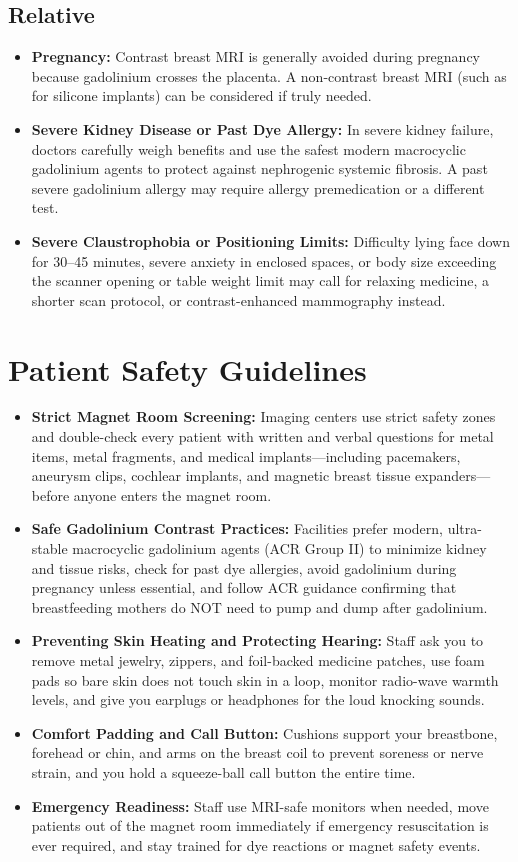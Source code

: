 \subsection{Relative}
\begin{itemize}
\item \textbf{Pregnancy:} Contrast breast MRI is generally avoided during pregnancy because gadolinium crosses the placenta. A non-contrast breast MRI (such as for silicone implants) can be considered if truly needed.
\item \textbf{Severe Kidney Disease or Past Dye Allergy:} In severe kidney failure, doctors carefully weigh benefits and use the safest modern macrocyclic gadolinium agents to protect against nephrogenic systemic fibrosis. A past severe gadolinium allergy may require allergy premedication or a different test.
\item \textbf{Severe Claustrophobia or Positioning Limits:} Difficulty lying face down for 30--45 minutes, severe anxiety in enclosed spaces, or body size exceeding the scanner opening or table weight limit may call for relaxing medicine, a shorter scan protocol, or contrast-enhanced mammography instead.
\end{itemize}

\section{Patient Safety Guidelines}
\begin{itemize}
\item \textbf{Strict Magnet Room Screening:} Imaging centers use strict safety zones and double-check every patient with written and verbal questions for metal items, metal fragments, and medical implants---including pacemakers, aneurysm clips, cochlear implants, and magnetic breast tissue expanders---before anyone enters the magnet room.
\item \textbf{Safe Gadolinium Contrast Practices:} Facilities prefer modern, ultra-stable macrocyclic gadolinium agents (ACR Group II) to minimize kidney and tissue risks, check for past dye allergies, avoid gadolinium during pregnancy unless essential, and follow ACR guidance confirming that breastfeeding mothers do NOT need to pump and dump after gadolinium.
\item \textbf{Preventing Skin Heating and Protecting Hearing:} Staff ask you to remove metal jewelry, zippers, and foil-backed medicine patches, use foam pads so bare skin does not touch skin in a loop, monitor radio-wave warmth levels, and give you earplugs or headphones for the loud knocking sounds.
\item \textbf{Comfort Padding and Call Button:} Cushions support your breastbone, forehead or chin, and arms on the breast coil to prevent soreness or nerve strain, and you hold a squeeze-ball call button the entire time.
\item \textbf{Emergency Readiness:} Staff use MRI-safe monitors when needed, move patients out of the magnet room immediately if emergency resuscitation is ever required, and stay trained for dye reactions or magnet safety events.
\end{itemize}

